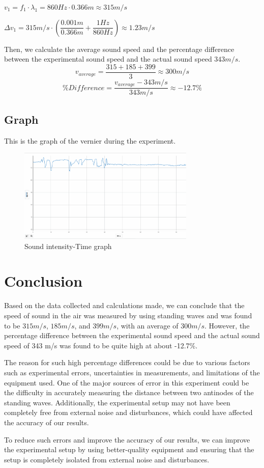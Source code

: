 \documentclass[15pt]{article}
\begin{document}
$v_1=f_1 \cdot \lambda_1=860Hz \cdot 0.366m \approx 315m/s$

$\Delta v_1=315m/s \cdot (\dfrac{0.001m}{0.366m}+\dfrac{1Hz}{860Hz}) \approx 1.23m/s$

Then, we calculate the average sound speed and the percentage difference between the experimental sound speed and the actual sound speed $343m/s$.
$$v_{average}=\dfrac{315+185+399}{3} \approx 300m/s$$
$$\% Difference=\dfrac{v_{average}-343m/s}{343m/s} \approx -12.7\%$$

\subsection{Graph}
This is the graph of the vernier during the experiment.
\begin{figure}[H]
    \centering
    \includegraphics[width=0.75\textwidth]{sound intensity-time graph.png}
    \caption{Sound intensity-Time graph}
\end{figure}

\section{Conclusion}
Based on the data collected and calculations made, we can conclude that the speed of sound in the air was measured by using standing waves and was found to be $315m/s$, $185m/s$, and $399m/s$, with an average of $300m/s$. However, the percentage difference between the experimental sound speed and the actual sound speed of 343 m/s was found to be quite high at about -12.7\%.

The reason for such high percentage differences could be due to various factors such as experimental errors, uncertainties in measurements, and limitations of the equipment used. One of the major sources of error in this experiment could be the difficulty in accurately measuring the distance between two antinodes of the standing waves. Additionally, the experimental setup may not have been completely free from external noise and disturbances, which could have affected the accuracy of our results.

To reduce such errors and improve the accuracy of our results, we can improve the experimental setup by using better-quality equipment and ensuring that the setup is completely isolated from external noise and disturbances.
\end{document}
